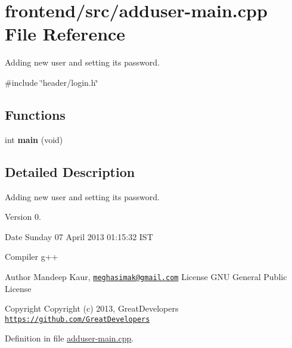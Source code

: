 \hypertarget{adduser-main_8cpp}{\section{frontend/src/adduser-\/main.cpp \-File \-Reference}
\label{d6/dad/adduser-main_8cpp}
}


\-Adding new user and setting its password.  


{\ttfamily \#include \char`\"{}header/login.\-h\char`\"{}}\*
\subsection*{\-Functions}
\begin{DoxyCompactItemize}
\item 
\hypertarget{adduser-main_8cpp_a840291bc02cba5474a4cb46a9b9566fe}{int {\bfseries main} (void)}\label{d6/dad/adduser-main_8cpp_a840291bc02cba5474a4cb46a9b9566fe}

\end{DoxyCompactItemize}


\subsection{\-Detailed \-Description}
\-Adding new user and setting its password. \begin{DoxyVersion}{\-Version}
0. 
\end{DoxyVersion}
\begin{DoxyDate}{\-Date}
\-Sunday 07 \-April 2013 01\-:15\-:32 \-I\-S\-T\par
 \-Compiler g++
\end{DoxyDate}
\begin{DoxyAuthor}{\-Author}
\-Mandeep \-Kaur, \href{mailto:meghasimak@gmail.com}{\tt meghasimak@gmail.\-com} \-License \-G\-N\-U \-General \-Public \-License 
\end{DoxyAuthor}
\begin{DoxyCopyright}{\-Copyright}
\-Copyright (c) 2013, \-Great\-Developers \href{https://github.com/GreatDevelopers}{\tt https\-://github.\-com/\-Great\-Developers} 
\end{DoxyCopyright}


\-Definition in file \hyperlink{adduser-main_8cpp_source}{adduser-\/main.\-cpp}.


